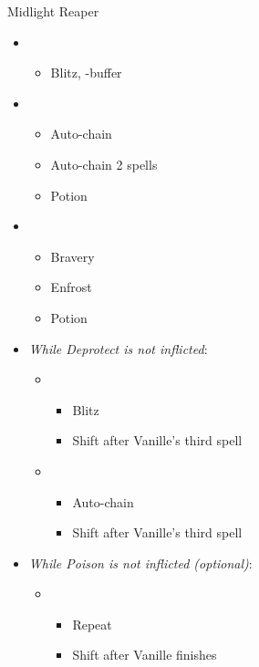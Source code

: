 	\vfill
	\begin{battle}[1:10]{Midlight Reaper}
		\begin{itemize}
			\item \first
			      \begin{itemize}
				      \item Blitz, \rav-buffer
			      \end{itemize}
			\item \fifth
			      \begin{itemize}
				      \item Auto-chain
				      \item Auto-chain 2 spells
				      \item Potion
			      \end{itemize}
			\item \third
			      \begin{itemize}
				      \item Bravery
				      \item Enfrost
				      \item Potion
			      \end{itemize}
			\item \textit{While Deprotect is not inflicted}:
			      \begin{itemize}
				      \item \sixth
				            \begin{itemize}
					            \item Blitz
					            \item Shift after Vanille's third spell
				            \end{itemize}
				      \item \fifth
				            \begin{itemize}
					            \item Auto-chain
					            \item Shift after Vanille's third spell
				            \end{itemize}
			      \end{itemize}
			\item \textit{While Poison is not inflicted (optional)}:
			      \begin{itemize}
				      \item \first
				            \begin{itemize}
					            \item Repeat
					            \item Shift after Vanille finishes

\end{itemize}
\end{itemize}
\end{itemize}
\end{battle}
